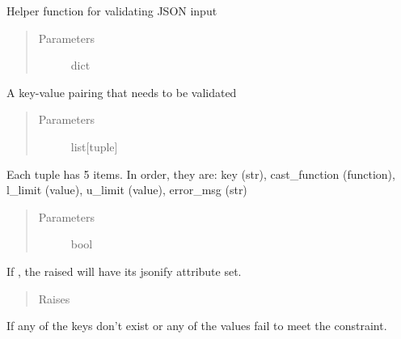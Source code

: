 \documentclass[letterpaper,10pt,english]{sphinxmanual}
\begin{document}
\begin{fulllineitems}
\label{\detokenize{tiger_leagues/models/readme:tiger_leagues.models.exception.validate_values}}
Helper function for validating JSON input
\begin{quote}\begin{description}
\item[{Parameters}] \leavevmode
{} \textendash{} dict

\end{description}\end{quote}

A key-value pairing that needs to be validated
\begin{quote}\begin{description}
\item[{Parameters}] \leavevmode
{} \textendash{} list{[}tuple{]}

\end{description}\end{quote}

Each tuple has 5 items. In order, they are: key (str), 
cast\_function (function), l\_limit (value), u\_limit (value), error\_msg (str)
\begin{quote}\begin{description}
\item[{Parameters}] \leavevmode
{} \textendash{} bool

\end{description}\end{quote}

If , the raised  will have its jsonify 
attribute set.
\begin{quote}\begin{description}
\item[{Raises}] \leavevmode
{}

\end{description}\end{quote}

If any of the keys don’t exist or any of the values fail to meet the 
constraint.

\end{fulllineitems}
\end{document}
